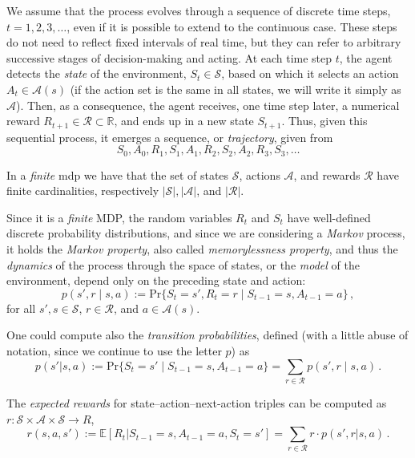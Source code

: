 We assume that the process evolves through a sequence of discrete time steps, $t = 1, 2, 3, \ldots$, even if it is possible to extend to the continuous case. These steps do not need to reflect fixed intervals of real time, but they can refer to arbitrary successive stages of decision-making and acting. At each time step $t$, the agent detects the \emph{state} of the environment, $S_t \in \mathcal S$, based on which it selects an action $A_t \in \mathcal A(s)$ (if the action set is the same in all states, we will write it simply as $\mathcal A$). Then, as a consequence, the agent receives, one time step later, a numerical reward $R_{t+1} \in \mathcal R \subset \mathbb R$, and ends up in a new state $S_{t+1}$. Thus, given this sequential process, it emerges a sequence, or \emph{trajectory}, given from
\begin{equation}
    S_0, A_0, R_1, S_1, A_1, R_2, S_2, A_2, R_3, S_3, \ldots
\end{equation}

In a \emph{finite} \acrshort{mdp} we have that the set of states $\mathcal S$, actions $\mathcal A$, and rewards $\mathcal R$ have finite cardinalities, respectively $|\mathcal S|, |\mathcal A|$, and $|\mathcal R|$.

Since it is a \textit{finite} MDP, the random variables $R_t$ and $S_t$ have well-defined discrete probability distributions, and since we are considering a \textit{Markov} process, it holds the \emph{Markov property}, also called \emph{memorylessness property}, and thus the \emph{dynamics} of the process through the space of states, or the \emph{model} of the environment, depend only on the preceding state and action:
\begin{equation}
    p(s', r \mid s, a) := \text{Pr}\{S_t = s', R_t = r \mid S_{t-1} = s, A_{t-1} = a\} \, ,
    \label{eq:transitions}
\end{equation}
for all $s', s \in \mathcal S$, $r \in \mathcal R$, and $a \in \mathcal A(s)$.

One could compute also the \emph{transition probabilities}, defined (with a little abuse of notation, since we continue to use the letter $p$) as
\begin{equation}
    p(s'|s, a) := \text{Pr}\{S_t = s' \mid S_{t-1} = s, A_{t-1} = a\} = \sum_{r \in \mathcal R} p(s', r \mid s, a) \, .
\end{equation}

The \emph{expected rewards} for state--action--next-action triples can be computed as $r: \mathcal S \times \mathcal A \times \mathcal S \to R$,
\begin{equation}
    r(s, a, s') := \mathbb E \left[ R_t | S_{t-1} = s, A_{t-1} = a, S_t = s' \right] = \sum_{r \in \mathcal R} r \cdot p(s', r | s, a) \, .
\end{equation}

